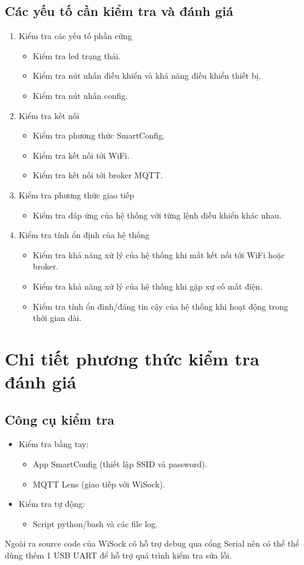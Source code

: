 \documentclass[a4paper]{article}
\let\oldsection\section
\renewcommand\section{\clearpage\oldsection}
\begin{document}
\subsection{Các yếu tố cần kiểm tra và đánh giá}
\begin{enumerate}
	\item Kiểm tra các yếu tố phần cứng
	\begin{itemize}
		\item Kiểm tra led trạng thái.
		\item Kiểm tra nút nhấn điều khiển và khả năng điều khiển thiết bị.
		\item Kiểm tra nút nhấn config.
	\end{itemize}
	\item Kiểm tra kết nối
	\begin{itemize}
		\item Kiểm tra phương thức SmartConfig.
		\item Kiểm tra kết nối tới WiFi.
		\item Kiểm tra kết nối tới broker MQTT.
	\end{itemize}
	\item Kiểm tra phương thức giao tiếp
	\begin{itemize}
		\item Kiểm tra đáp ứng của hệ thống với từng lệnh điều khiển khác nhau.
	\end{itemize}
	\item Kiểm tra tính ổn định của hệ thống
	\begin{itemize}
		\item Kiểm tra khả năng xử lý của hệ thống khi mất kết nối tới WiFi hoặc broker.
		\item Kiểm tra khả năng xử lý của hệ thống khi gặp xự cố mất điện.
		\item Kiểm tra tính ổn đinh/đáng tin cậy của hệ thống khi hoạt động trong thời gian dài.
	\end{itemize}
\end{enumerate}

\section{Chi tiết phương thức kiểm tra đánh giá}
\subsection{Công cụ kiểm tra}
\begin{itemize}
	\item Kiểm tra bằng tay:
	\begin{itemize}
		\item App SmartConfig (thiết lập SSID và password).
		\item MQTT Lens (giao tiếp với WiSock).
	\end{itemize}
	\item Kiểm tra tự động:
	\begin{itemize}
		\item Script python/bash và các file log.
	\end{itemize}
\end{itemize}
Ngoài ra source code của WiSock có hỗ trợ debug qua cổng Serial nên có thể thể dùng thêm 1 USB UART để hỗ trợ quá trình kiểm tra sửa lỗi.
\end{document}
